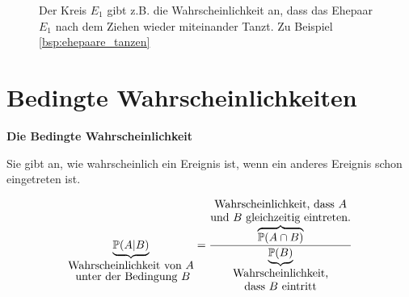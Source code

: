 {    \begin{figure}
    \centering
    \label{fig:teilmengen}
    \caption{Der Kreis $E_1$ gibt z.B. die Wahrscheinlichkeit an, dass das Ehepaar $E_1$ nach dem Ziehen wieder miteinander Tanzt. Zu Beispiel \ref{bsp:ehepaare_tanzen}}
    \end{figure}

    \ifdefined\uebsps
    \newpage
    \newExercPage
    
    \fi


	\newpage
    \section{Bedingte Wahrscheinlichkeiten}

    \begin{definition}\textbf{Die Bedingte Wahrscheinlichkeit}
    \label{def:bedingte_wahrscheinlichkeit}

    Sie gibt an, wie wahrscheinlich ein Ereignis
    ist, wenn ein anderes Ereignis schon eingetreten ist.

    \[
        \underbrace{\mathbb{P}(A|B)}_{\shortstack{\text{Wahrscheinlichkeit von $A$}\\\text{ unter der Bedingung $B$}}}=
        \frac{\overbrace{\mathbb P(A\cap B)}^{\shortstack{\text{Wahrscheinlichkeit, dass $A$}\\\text{und $B$ gleichzeitig eintreten.}}}}
        {\underbrace{\mathbb{P}(B)}_{\shortstack{\text{Wahrscheinlichkeit,}\\\text{dass $B$ eintritt}}}}
    \]
    \end{definition}

}
